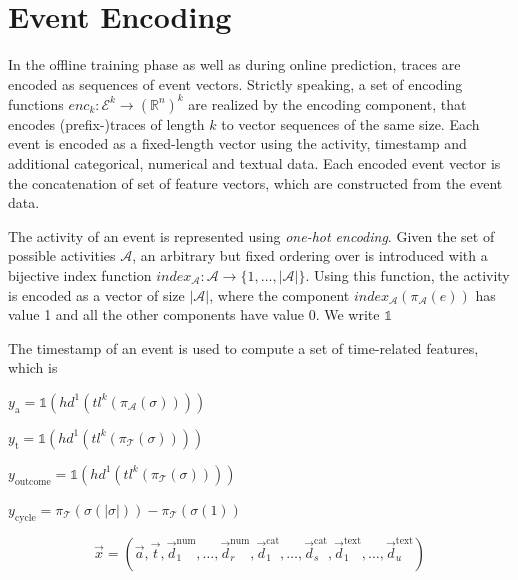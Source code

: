 \section{Event Encoding}

In the offline training phase as well as during online prediction, traces are encoded as sequences of event vectors.
Strictly speaking, a set of encoding functions  $enc_k \colon \mathcal{E}^k \to (\mathbb{R}^n)^k$ are realized by the encoding component, that encodes (prefix-)traces of length $k$ to vector sequences of the same size.
Each event is encoded as a fixed-length vector using the activity, timestamp and additional categorical, numerical and textual data.
Each encoded event vector is the concatenation of set of feature vectors, which are constructed from the event data.

The activity of an event is represented using \textit{one-hot encoding}.
Given the set of possible activities $\mathcal{A}$, an arbitrary but fixed ordering over is introduced with a bijective index function $index_\mathcal{A} \colon \mathcal{A} \to \{1, \dots, |\mathcal{A}|\}$.
Using this function, the activity is encoded as a vector of size $|\mathcal{A}|$, where the component $index_\mathcal{A}(\pi_\mathcal{A}(e))$ has value 1 and all the other components have value 0.
We write $\mathds{1}$

The timestamp of an event is used to compute a set of time-related features, which is 

$y_\mathrm{a} = \mathds{1}(hd^1(tl^k(\pi_\mathcal{A}(\sigma))))$

$y_\mathrm{t} = \mathds{1}(hd^1(tl^k(\pi_\mathcal{T}(\sigma))))$

$y_\mathrm{outcome} = \mathds{1}(hd^1(tl^k(\pi_\mathcal{T}(\sigma))))$

$y_\mathrm{cycle} =  \pi_\mathcal{T}(\sigma(|\sigma|))-  \pi_\mathcal{T}(\sigma(1))$

\begin{equation}
	\vec{x}=(
	\vec{a},
	\vec{t},
	\vec{d}_1^\mathrm{num}, \dots,\vec{d}_r^\mathrm{num},
	\vec{d}_1^\mathrm{cat}, \dots,\vec{d}_s^\mathrm{cat},
	\vec{d}_1^\mathrm{text}, \dots, \vec{d}_u^\mathrm{text})
\end{equation}


